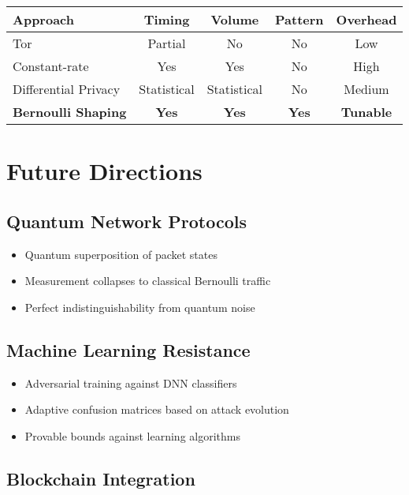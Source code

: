 \documentclass[11pt,final]{article}
\begin{document}
\begin{center}
\begin{tabular}{lcccc}
\toprule
\textbf{Approach} & \textbf{Timing} & \textbf{Volume} & \textbf{Pattern} & \textbf{Overhead} \\
\midrule
Tor & Partial & No & No & Low \\
Constant-rate & Yes & Yes & No & High \\
Differential Privacy & Statistical & Statistical & No & Medium \\
\textbf{Bernoulli Shaping} & \textbf{Yes} & \textbf{Yes} & \textbf{Yes} & \textbf{Tunable} \\
\bottomrule
\end{tabular}
\end{center}

\section{Future Directions}

\subsection{Quantum Network Protocols}

\begin{itemize}
    \item Quantum superposition of packet states
    \item Measurement collapses to classical Bernoulli traffic
    \item Perfect indistinguishability from quantum noise
\end{itemize}

\subsection{Machine Learning Resistance}

\begin{itemize}
    \item Adversarial training against DNN classifiers
    \item Adaptive confusion matrices based on attack evolution
    \item Provable bounds against learning algorithms
\end{itemize}

\subsection{Blockchain Integration}
\end{document}
